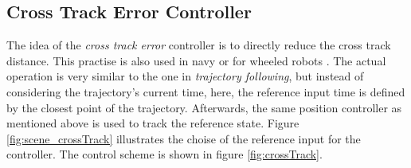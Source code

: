 %

\subsection{Cross Track Error Controller}
The idea of the \textit{cross track error} controller is to directly reduce the cross track distance. This practise is also used in navy \cite{williams} or for wheeled robots \cite{deluca}. The actual operation is very similar to the one in \textit{trajectory following}, but instead of considering the trajectory's current time, here, the reference input time is defined by the closest point of the trajectory. Afterwards, the same position controller as mentioned above is used to track the reference state. Figure \ref{fig:scene_crossTrack} illustrates the choise of the reference input for the controller. The control scheme is shown in figure \ref{fig:crossTrack}.


